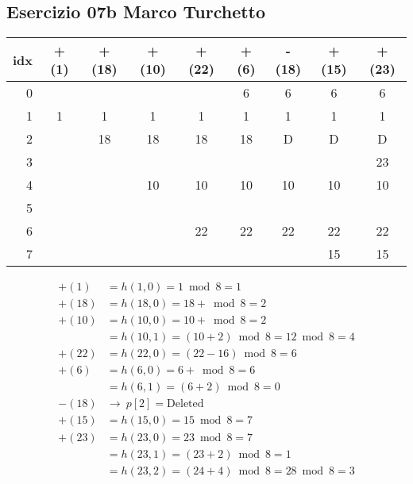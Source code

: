 
\subsection[07b MT]{Esercizio 07b Marco Turchetto}

\begin{center}
	\begin{tabular}{r | *{8}{c|}}
		idx & +(1) & +(18) & +(10) & +(22) & +(6) & -(18) & +(15) & +(23) \\ \hline
		0   &      &       &       &       &    6 &     6 &     6 &    6  \\ \cline{2-9}
		1   &    1 &     1 &     1 &     1 &    1 &     1 &     1 &    1  \\ \cline{2-9}
		2   &      &    18 &    18 &    18 &   18 &     D &     D &    D  \\ \cline{2-9}
		3   &      &       &       &       &      &       &       &   23  \\ \cline{2-9}
		4   &      &       &    10 &    10 &   10 &    10 &    10 &   10  \\ \cline{2-9}
		5   &      &       &       &       &      &       &       &       \\ \cline{2-9}
		6   &      &       &       &    22 &   22 &    22 &    22 &   22  \\ \cline{2-9}
		7   &      &       &       &       &      &       &    15 &   15  \\ \cline{2-9}
	\end{tabular}
\end{center}

\begin{align*}
	+(1)  &= h(1,0)  = 1 \bmod 8 = 1 \\
	+(18) &= h(18,0) = 18 + \bmod 8 = 2 \\
	+(10) &= h(10,0) = 10 + \bmod 8 = 2 \\
		  &= h(10,1) = (10 + 2) \bmod 8 = 12 \bmod 8 = 4 \\
	+(22) &= h(22,0) = (22 - 16) \bmod 8 = 6 \\
	+(6)  &= h(6,0)  = 6 + \bmod 8 = 6 \\
		  &= h(6,1)  = (6 + 2) \bmod 8 = 0 \\
	-(18) &\rightarrow \ p[2] = \text{Deleted} \\
	+(15) &= h(15,0) = 15 \bmod 8 = 7 \\
	+(23) &= h(23,0) = 23 \bmod 8 = 7 \\
		  &= h(23,1) = (23 + 2) \bmod 8 = 1 \\
		  &= h(23,2) = (24 + 4) \bmod 8= 28 \bmod 8 = 3 \\
\end{align*}



